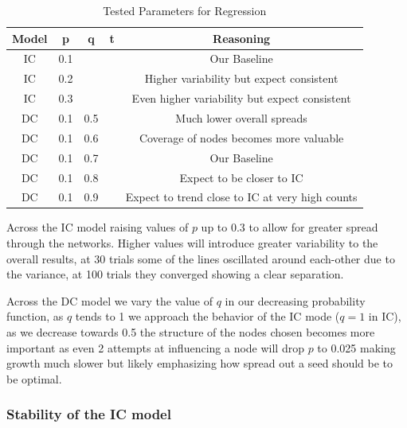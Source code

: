\documentclass{article}
\begin{document}
\begin{table}[h]
	\centering
	\begin{tabular}{|c|c|c|c|c|}
		\hline
		\textbf{Model} & \textbf{p} & \textbf{q} & \textbf{t} & \textbf{Reasoning}                              \\
		\hline
		IC             & 0.1        &            &            & Our Baseline                                    \\
		IC             & 0.2        &            &            & Higher variability but expect consistent        \\
		IC             & 0.3        &            &            & Even higher variability but expect consistent   \\
		\hline
		DC             & 0.1        & 0.5        &            & Much lower overall spreads                      \\
		DC             & 0.1        & 0.6        &            & Coverage of nodes becomes more valuable         \\
		DC             & 0.1        & 0.7        &            & Our Baseline                                    \\
		DC             & 0.1        & 0.8        &            & Expect to be closer to IC                       \\
		DC             & 0.1        & 0.9        &            & Expect to trend close to IC at very high counts \\
		\hline
	\end{tabular}
	\caption{Tested Parameters for Regression}
	\label{param-table}
\end{table}

Across the IC model raising values of $p$ up to 0.3 to allow for greater spread through the networks.
Higher values will introduce greater variability to the overall results, at 30 trials some of the lines oscillated around each-other due to the variance, at 100 trials they converged showing a clear separation.

Across the DC model we vary the value of $q$ in our decreasing probability function, as $q$ tends to 1 we approach the behavior of the IC mode ($q=1$ in IC), as we decrease towards 0.5 the structure of the nodes chosen becomes more important as even 2 attempts at influencing a node will drop $p$ to 0.025 making growth much slower but likely emphasizing how spread out a seed should be to be optimal.

\subsubsection{Stability of the IC model}
\end{document}
